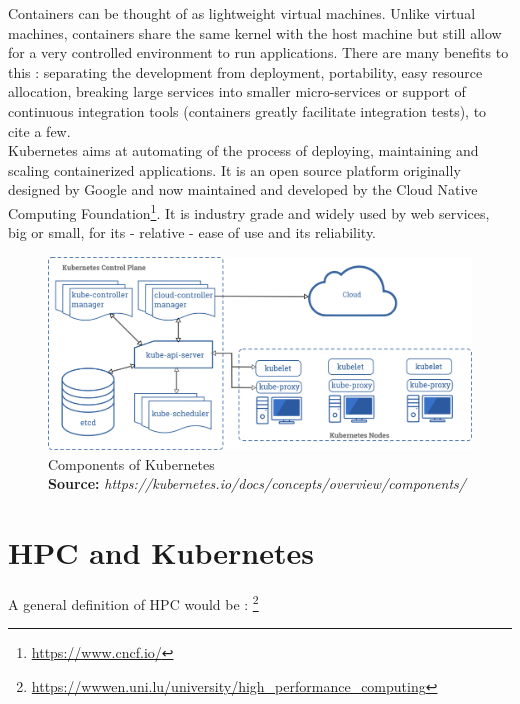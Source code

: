 \documentclass[12pt]{report}
\newcommand*{\captionsource}[2]{%
    \caption[{#1}]{%
        #1%
        \\\hspace{\linewidth}%
	\textbf{Source:} \textit{#2}%
    }%
}
\begin{document}
Containers can be thought of as lightweight virtual machines. Unlike virtual
machines, containers share the same kernel with the host machine but still
allow for a very controlled environment to run applications. There are many
benefits to this : separating the development from deployment, portability,
easy resource allocation, breaking large services into smaller micro-services
or support of continuous integration tools (containers greatly facilitate
integration tests), to cite a few.\\

Kubernetes\cite{kubernetes} aims at automating of the process of deploying,
maintaining and scaling containerized applications. It is an open source
platform originally designed by Google and now maintained and developed by the
Cloud Native Computing Foundation\footnote{\url{https://www.cncf.io/}}. It is
industry grade and widely used by web services, big or small, for its -
relative - ease of use and its reliability.

\begin{figure}[]
	\centering
	\includegraphics[width=\textwidth]{imgs/components-of-kubernetes.png}
	\captionsource{Components of Kubernetes}{https://kubernetes.io/docs/concepts/overview/components/}
	\label{fig:kube-components}
\end{figure}

\section{HPC and Kubernetes}
A general definition of HPC would be :
\footnote{\url{https://wwwen.uni.lu/university/high_performance_computing}}
\end{document}
